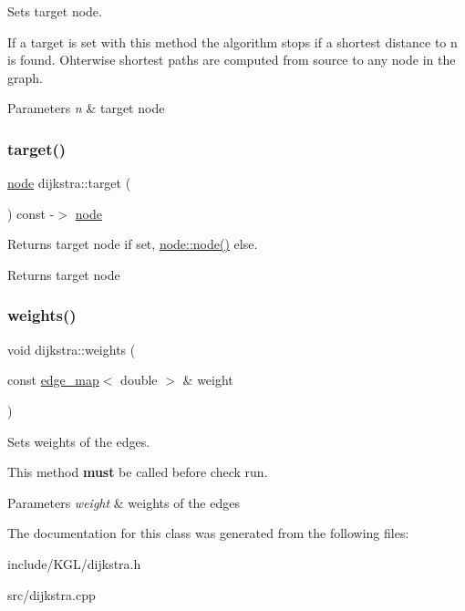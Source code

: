 Sets target node. 

If a target is set with this method the algorithm stops if a shortest distance to {\ttfamily n} is found. Ohterwise shortest paths are computed from source to any node in the graph.


\begin{DoxyParams}{Parameters}
{\em n} & target node \\
\hline
\end{DoxyParams}
\mbox{\label{classdijkstra_a124934fec15045573a09df2da9e515ea}} 
\subsubsection{\texorpdfstring{target()}{target()}\hspace{0.1cm}{\footnotesize\ttfamily [2/2]}}
{\footnotesize\ttfamily \mbox{\hyperlink{classnode}{node}} dijkstra\+::target (\begin{DoxyParamCaption}{ }\end{DoxyParamCaption}) const -\/$>$ \mbox{\hyperlink{classnode}{node}}}



Returns target node if set, {\ttfamily \mbox{\hyperlink{classnode_ad603259398d5667e3b97a6322a2bcc20}{node\+::node()}}} else. 

\begin{DoxyReturn}{Returns}
target node 
\end{DoxyReturn}
\mbox{\label{classdijkstra_a92f4394b757f6ffcb372535114a6cbf6}} 
\subsubsection{\texorpdfstring{weights()}{weights()}}
{\footnotesize\ttfamily void dijkstra\+::weights (\begin{DoxyParamCaption}\item[{const \mbox{\hyperlink{classedge__map}{edge\+\_\+map}}$<$ double $>$ \&}]{weight }\end{DoxyParamCaption})}



Sets weights of the edges. 

This method {\bfseries must} be called before check run.


\begin{DoxyParams}{Parameters}
{\em weight} & weights of the edges \\
\hline
\end{DoxyParams}


The documentation for this class was generated from the following files\+:\begin{DoxyCompactItemize}
\item 
include/\+K\+G\+L/dijkstra.\+h\item 
src/dijkstra.\+cpp\end{DoxyCompactItemize}
